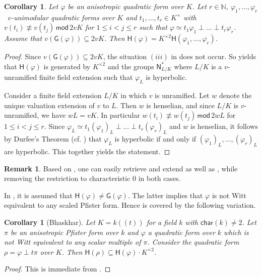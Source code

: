 \documentclass[twoside,11pt]{amsart}
\numberwithin{equation}{section}
\newtheorem{cor}[equation]{Corollary}
\theoremstyle{definition}
\newtheorem{rem}[equation]{Remark}
\renewcommand{\bmod}{\operatorname{\,\,\mathsf{mod}}\,\,}
\newcommand\N{\operatorname{N}}
\newcommand{\car}{\mathsf{char}}
\newcommand{\vf}{\varphi}
\newcommand{\mg}[1]{{#1}^{\times}}
\newcommand{\sq}[1]{{#1}^{\times 2}}
\newcommand{\nat}{\mathbb{N}}
\renewcommand{\leq}{\leqslant}
\renewcommand{\N}{\mathsf{N}}
\newcommand{\G}{\mathsf{G}}
\renewcommand{\H}{\mathsf{H}}
\renewcommand{\leq}{\leqslant}
\renewcommand{\bmod}{\,\mathsf{mod}\,}
\begin{document}
\begin{cor}\label{C:equimodular-dec}
    Let $\varphi$ be an anisotropic quadratic form over $K$. 
    Let $r\in\nat$, $\varphi_1,\dots,\varphi_r$\,  $v$-unimodular quadratic forms  over $K$ and $t_1,\dots,t_r\in \mg{K}$ with $v(t_i)\not\equiv v(t_j)\bmod 2vK$ for $1\leq i<j\leq r$ such that $\varphi\simeq  t_1\varphi_1\perp\ldots\perp t_r\varphi_r$.
Assume that $v(\G(\varphi))\subseteq 2vK$.
Then $\H(\varphi)=\sq{K}\H(\vf_1,\dots,\vf_r)$. 
\end{cor}
\begin{proof}
Since $v(\G(\varphi))\subseteq 2vK$,
the situation $(iii)$ in  does not occur. So  yields that $\H(\varphi)$ is generated by $\sq{K}$ and the groups $\N_{L/K}^\ast$ where $L/K$ is a $v$-unramified finite field extension such that $\varphi_L$ is hyperbolic.

Consider a finite field extension $L/K$ in which $v$ is unramified.
Let $w$ denote the unique valuation extension of $v$ to $L$.  Then $w$ is henselian, and since $L/K$ is $v$-unramified, we have $wL=vK$.
    In particular $w(t_i)\not\equiv w(t_j)\bmod 2wL$ for $1\leq i<j\leq r$.
    Since $\varphi_L\simeq t_1(\varphi_1)_L\perp\ldots\perp t_r(\varphi_r)_L$ and $w$ is henselian, 
    it follows by Durfee's Theorem (cf. \cite[Theorem 3.11]{BDM25}) that $\varphi_L$ is hyperbolic if and only if $(\varphi_1)_L,\dots,(\varphi_r)_L$ are hyperbolic. This together yields the statement.
\end{proof}

\begin{rem}
Based on , one can easily retrieve and extend \cite[Prop.~1]{Gil97} as well as \cite[Prop.~5.2 \& 5.3]{Bha14}, while removing the restriction to characteristic $0$ in both cases. %

In \cite[Sect.~5]{Bha14}, it is assumed that %
$\H(\vf)\neq \G(\vf)$.
The latter implies that $\vf$ is not Witt equivalent to any scaled Pfister form.
Hence  \cite[Prop.~5.2 \& 5.3]{Bha14} is covered by the following variation.
\end{rem}

\begin{cor}[Bhaskhar]\label{Bhakhar-S5}
    Let $K=k(\!(t)\!)$ for a field $k$ with \hbox{$\car(k)\neq 2$}.  
    Let $\pi$ be an anisotropic Pfister form over $k$ and $\vf$ a quadratic form over $k$ which is not Witt equivalent to any scalar multiple of $\pi$.
    Consider the quadratic form $\rho=\varphi\perp t\pi$ over $K$.
    Then $\H(\rho)\subseteq \H(\vf)\cdot \sq{K}$. 
\end{cor}
\begin{proof}
    This is immediate from .
\end{proof}
\end{document}
